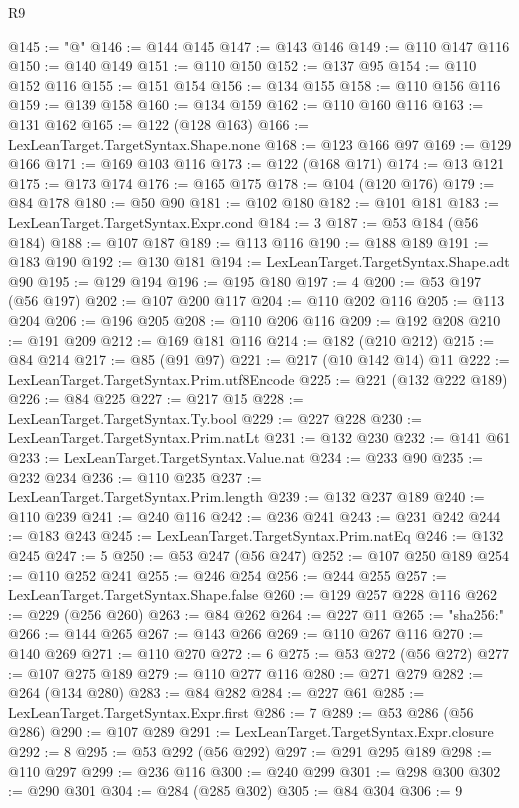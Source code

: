 \begin{lexlean}{R9}
\begin{coremodule}
@145 := "@"
@146 := @144 @145
@147 := @143 @146
@149 := @110 @147 @116
@150 := @140 @149
@151 := @110 @150
@152 := @137 @95
@154 := @110 @152 @116
@155 := @151 @154
@156 := @134 @155
@158 := @110 @156 @116
@159 := @139 @158
@160 := @134 @159
@162 := @110 @160 @116
@163 := @131 @162
@165 := @122 (@128 @163)
@166 := LexLeanTarget.TargetSyntax.Shape.none
@168 := @123 @166 @97
@169 := @129 @166
@171 := @169 @103 @116
@173 := @122 (@168 @171)
@174 := @13 @121
@175 := @173 @174
@176 := @165 @175
@178 := @104 (@120 @176)
@179 := @84 @178
@180 := @50 @90
@181 := @102 @180
@182 := @101 @181
@183 := LexLeanTarget.TargetSyntax.Expr.cond
@184 := 3
@187 := @53 @184 (@56 @184)
@188 := @107 @187
@189 := @113 @116
@190 := @188 @189
@191 := @183 @190
@192 := @130 @181
@194 := LexLeanTarget.TargetSyntax.Shape.adt @90
@195 := @129 @194
@196 := @195 @180
@197 := 4
@200 := @53 @197 (@56 @197)
@202 := @107 @200 @117
@204 := @110 @202 @116
@205 := @113 @204
@206 := @196 @205
@208 := @110 @206 @116
@209 := @192 @208
@210 := @191 @209
@212 := @169 @181 @116
@214 := @182 (@210 @212)
@215 := @84 @214
@217 := @85 (@91 @97)
@221 := @217 (@10 @142 @14) @11
@222 := LexLeanTarget.TargetSyntax.Prim.utf8Encode
@225 := @221 (@132 @222 @189)
@226 := @84 @225
@227 := @217 @15
@228 := LexLeanTarget.TargetSyntax.Ty.bool
@229 := @227 @228
@230 := LexLeanTarget.TargetSyntax.Prim.natLt
@231 := @132 @230
@232 := @141 @61
@233 := LexLeanTarget.TargetSyntax.Value.nat
@234 := @233 @90
@235 := @232 @234
@236 := @110 @235
@237 := LexLeanTarget.TargetSyntax.Prim.length
@239 := @132 @237 @189
@240 := @110 @239
@241 := @240 @116
@242 := @236 @241
@243 := @231 @242
@244 := @183 @243
@245 := LexLeanTarget.TargetSyntax.Prim.natEq
@246 := @132 @245
@247 := 5
@250 := @53 @247 (@56 @247)
@252 := @107 @250 @189
@254 := @110 @252 @241
@255 := @246 @254
@256 := @244 @255
@257 := LexLeanTarget.TargetSyntax.Shape.false
@260 := @129 @257 @228 @116
@262 := @229 (@256 @260)
@263 := @84 @262
@264 := @227 @11
@265 := "sha256:"
@266 := @144 @265
@267 := @143 @266
@269 := @110 @267 @116
@270 := @140 @269
@271 := @110 @270
@272 := 6
@275 := @53 @272 (@56 @272)
@277 := @107 @275 @189
@279 := @110 @277 @116
@280 := @271 @279
@282 := @264 (@134 @280)
@283 := @84 @282
@284 := @227 @61
@285 := LexLeanTarget.TargetSyntax.Expr.first
@286 := 7
@289 := @53 @286 (@56 @286)
@290 := @107 @289
@291 := LexLeanTarget.TargetSyntax.Expr.closure
@292 := 8
@295 := @53 @292 (@56 @292)
@297 := @291 @295 @189
@298 := @110 @297
@299 := @236 @116
@300 := @240 @299
@301 := @298 @300
@302 := @290 @301
@304 := @284 (@285 @302)
@305 := @84 @304
@306 := 9

\end{coremodule}
\end{lexlean}
